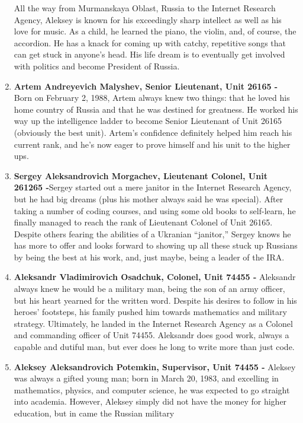 \documentclass[10pt, letterpaper]{article}
\begin{document}
\begin{enumerate}
  All the way from Murmanskaya Oblast, Russia to the Internet Research
  Agency, Aleksey is known for his exceedingly sharp intellect as well
  as his love for music. As a child, he learned the piano, the violin,
  and, of course, the accordion. He has a knack for coming up with
  catchy, repetitive songs that can get stuck in anyone's head. His life
  dream is to eventually get involved with politics and become President
  of Russia.
\item
  \textbf{Artem Andreyevich Malyshev, Senior Lieutenant, Unit 26165 -}
  Born on February 2, 1988, Artem always knew two things: that he loved
  his home country of Russia and that he was destined for greatness. He
  worked his way up the intelligence ladder to become Senior Lieutenant
  of Unit 26165 (obviously the best unit). Artem's confidence definitely
  helped him reach his current rank, and he's now eager to prove himself
  and his unit to the higher ups.
\item
  \textbf{Sergey Aleksandrovich Morgachev, Lieutenant Colonel, Unit
  261265 -}Sergey started out a mere janitor in the Internet Research
  Agency, but he had big dreams (plus his mother always said he was
  special). After taking a number of coding courses, and using some old
  books to self-learn, he finally managed to reach the rank of
  Lieutenant Colonel of Unit 26165. Despite others fearing the abilities
  of a Ukranian ``janitor,'' Sergey knows he has more to offer and looks
  forward to showing up all these stuck up Russians by being the best at
  his work, and, just maybe, being a leader of the IRA.
\item
  \textbf{Aleksandr Vladimirovich Osadchuk, Colonel, Unit 74455 -}
  Aleksandr always knew he would be a military man, being the son of an
  army officer, but his heart yearned for the written word. Despite his
  desires to follow in his heroes' footsteps, his family pushed him
  towards mathematics and military strategy. Ultimately, he landed in
  the Internet Research Agency as a Colonel and commanding officer of
  Unit 74455. Aleksandr does good work, always a capable and dutiful
  man, but ever does he long to write more than just code.
\item
  \textbf{Aleksey Aleksandrovich Potemkin, Supervisor, Unit 74455 -}
  Aleksey was always a gifted young man; born in March 20, 1983, and
  excelling in mathematics, physics, and computer science, he was
  expected to go straight into academia. However, Aleksey simply did not
  have the money for higher education, but in came the Russian military

\end{enumerate}
\end{document}
